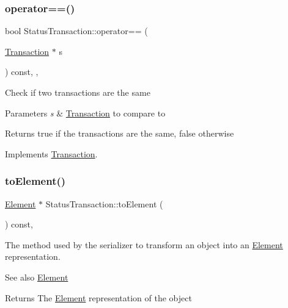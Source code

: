 \subsubsection{\texorpdfstring{operator==()}{operator==()}}
{\footnotesize\ttfamily bool Status\+Transaction\+::operator== (\begin{DoxyParamCaption}\item[{\mbox{\hyperlink{classTransaction}{Transaction}} $\ast$}]{s }\end{DoxyParamCaption}) const\hspace{0.3cm}{\ttfamily [inline]}, {\ttfamily [override]}, {\ttfamily [virtual]}}

Check if two transactions are the same


\begin{DoxyParams}{Parameters}
{\em s} & \mbox{\hyperlink{classTransaction}{Transaction}} to compare to \\
\hline
\end{DoxyParams}
\begin{DoxyReturn}{Returns}
true if the transactions are the same, false otherwise 
\end{DoxyReturn}


Implements \mbox{\hyperlink{classTransaction_a9a17c97fdcda6791484ad6d07b34470e}{Transaction}}.

\mbox{\label{classStatusTransaction_aed42f2d61f2d50ec07bb6b35473f61f2}} 
\subsubsection{\texorpdfstring{to\+Element()}{toElement()}}
{\footnotesize\ttfamily \mbox{\hyperlink{classElement}{Element}} $\ast$ Status\+Transaction\+::to\+Element (\begin{DoxyParamCaption}{ }\end{DoxyParamCaption}) const\hspace{0.3cm}{\ttfamily [override]}, {\ttfamily [virtual]}}

The method used by the serializer to transform an object into an \mbox{\hyperlink{classElement}{Element}} representation. \begin{DoxySeeAlso}{See also}
\mbox{\hyperlink{classElement}{Element}}
\end{DoxySeeAlso}
\begin{DoxyReturn}{Returns}
The \mbox{\hyperlink{classElement}{Element}} representation of the object 
\end{DoxyReturn}


